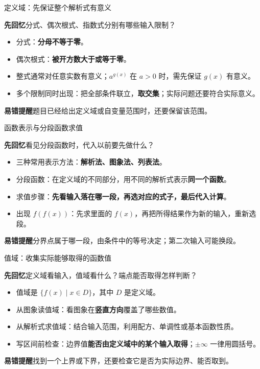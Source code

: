 \documentclass[UTF8,10pt,aspectratio=169]{ctexbeamer}
\newcommand{\Recall}[1]{\par\noindent\textcolor{KnowledgeBlue}{\textbf{先回忆}\quad #1}\par\vspace{0.3cm}}
\newcommand{\Pitfall}[1]{\par\vspace{0.22cm}\noindent\textbf{易错提醒}\quad #1\par}
\begin{document}
\begin{frame}[t]{定义域：先保证整个解析式有意义}
\large
\Recall{分式、偶次根式、指数式分别有哪些输入限制？}
\pause
\begin{itemize}
  \item 分式：\textbf{分母不等于零}。
  \item 偶次根式：\textbf{被开方数大于或等于零}。
  \item 整式通常对任意实数有意义；$a^{g(x)}$ 在 $a>0$ 时，需先保证 $g(x)$ 有意义。
  \item 多个限制同时出现：把全部条件联立，\textbf{取交集}；实际问题还要符合实际意义。
\end{itemize}
\Pitfall{题目已经给出定义域或自变量范围时，还要保留该范围。}
\end{frame}

\begin{frame}[t]{函数表示与分段函数求值}
\large
\Recall{看见分段函数时，代入以前要先做什么？}
\pause
\begin{itemize}
  \item 三种常用表示方法：\textbf{解析法、图象法、列表法}。
  \item 分段函数：在定义域的不同部分，用不同的解析式表示\textbf{同一个函数}。
  \item 求值步骤：\textbf{先看输入落在哪一段，再选对应的式子，最后代入计算}。
  \item 出现 $f(f(x))$：先求里面的 $f(x)$，再把所得结果作为新的输入，重新选段。
\end{itemize}
\Pitfall{分界点属于哪一段，由条件中的等号决定；第二次输入可能换段。}
\end{frame}

\begin{frame}[t]{值域：收集实际能够取得的函数值}
\large
\Recall{定义域看输入，值域看什么？端点能否取得怎样判断？}
\pause
\begin{itemize}
  \item 值域是 $\{f(x)\mid x\in D\}$，其中 $D$ 是定义域。
  \item 从图象读值域：看图象在\textbf{竖直方向}覆盖了哪些数值。
  \item 从解析式求值域：结合输入范围，利用配方、单调性或基本函数性质。
  \item 写区间前检查：边界值\textbf{能否由定义域中的某个输入取得}；$\pm\infty$ 一律用圆括号。
\end{itemize}
\Pitfall{找到一个上界或下界，还要检查它是否为实际边界、能否取到。}
\end{frame}
\end{document}
